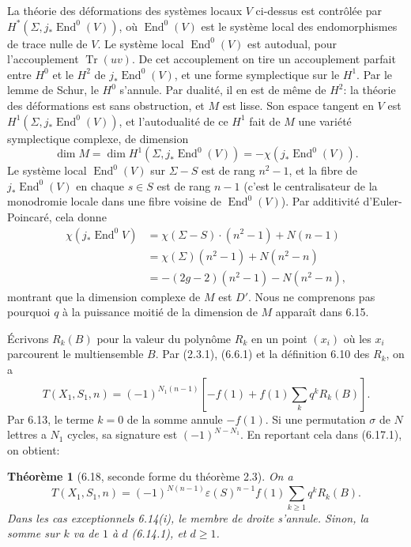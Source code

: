 \documentclass[10pt]{article}
\newcommand{\End}{\operatorname{End}}
\newcommand{\Tr}{\operatorname{Tr}}
\theoremstyle{deligne}
\newtheorem*{theorem*}{Théorème}
\newcommand{\heading}[1]{\vspace{0.7em}\noindent{\bfseries #1}\quad}
\begin{document}
La théorie des déformations des systèmes locaux $V$ ci-dessus est contrôlée par $H^*(\Sigma,j_*\End^0(V))$, où $\End^0(V)$ est le système local des endomorphismes de trace nulle de $V$. Le système local $\End^0(V)$ est autodual, pour l'accouplement $\Tr(uv)$. De cet accouplement on tire un accouplement parfait entre $H^0$ et le $H^2$ de $j_*\End^0(V)$, et une forme symplectique sur le $H^1$. Par le lemme de Schur, le $H^0$ s'annule. Par dualité, il en est de même de $H^2$: la théorie des déformations est sans obstruction, et $M$ est lisse. Son espace tangent en $V$ est $H^1(\Sigma,j_*\End^0(V))$, et l'autodualité de ce $H^1$ fait de $M$ une variété symplectique complexe, de dimension
\[
\dim M=\dim H^1(\Sigma,j_*\End^0(V))=-\chi(j_*\End^0(V)).
\]
Le système local $\End^0(V)$ sur $\Sigma-S$ est de rang $n^2-1$, et la fibre de $j_*\End^0(V)$ en chaque $s\in S$ est de rang $n-1$ (c'est le centralisateur de la monodromie locale dans une fibre voisine de $\End^0(V)$). Par additivité d'Euler-Poincaré, cela donne
\begin{align*}
\chi(j_*\End^0 V)&=\chi(\Sigma-S)\cdot(n^2-1)+N(n-1)\\
&=\chi(\Sigma)(n^2-1)+N(n^2-n)\\
&=-(2g-2)(n^2-1)-N(n^2-n),
\end{align*}
montrant que la dimension complexe de $M$ est $D'$. Nous ne comprenons pas pourquoi $q$ à la puissance moitié de la dimension de $M$ apparaît dans 6.15.

\heading{6.17.} Écrivons $R_k(B)$ pour la valeur du polynôme $R_k$ en un point $(x_i)$ où les $x_i$ parcourent le multiensemble $B$. Par (2.3.1), (6.6.1) et la définition 6.10 des $R_k$, on a
\begin{equation}\tag{6.17.1}
T(X_1,S_1,n)=(-1)^{N_1(n-1)}\left[-f(1)+f(1)\sum_k q^kR_k(B)\right].
\end{equation}
Par 6.13, le terme $k=0$ de la somme annule $-f(1)$. Si une permutation $\sigma$ de $N$ lettres a $N_1$ cycles, sa signature est $(-1)^{N-N_1}$. En reportant cela dans (6.17.1), on obtient:

\begin{theorem*}[6.18, seconde forme du théorème 2.3]
On a
\begin{equation}\tag{6.18.1}
T(X_1,S_1,n)=(-1)^{N(n-1)}\varepsilon(S)^{n-1}f(1)\sum_{k\ge1}q^kR_k(B).
\end{equation}
Dans les cas exceptionnels 6.14(i), le membre de droite s'annule. Sinon, la somme sur $k$ va de $1$ à $d$ (6.14.1), et $d\ge1$.
\end{theorem*}
\end{document}
